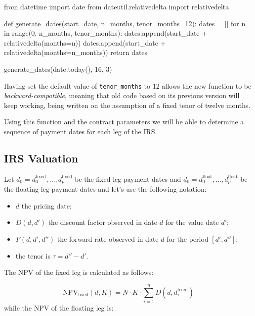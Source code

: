 \begin{ipython}
from datetime import date
from dateutil.relativedelta import relativedelta

def generate_dates(start_date, n_months, tenor_months=12):
    dates = []
    for n in range(0, n_months, tenor_months):
        dates.append(start_date + relativedelta(months=n))
    dates.append(start_date + relativedelta(months=n_months))
    return dates
    
generate_dates(date.today(), 16, 3)
\end{ipython}
\begin{ioutput}
\end{ioutput}
Having set the default value of \texttt{tenor\_months} to 12 allows the new function to be \emph{backward-compatible}, meaning that old code based on its previous version will keep working, being written on the assumption of a fixed tenor of twelve months. 
       
Using this function and the contract parameters we will be able to determine a sequence of payment dates for each leg of the IRS.

\subsection{IRS Valuation}
\label{irs-valuation}

Let \(d_0=d_0^{\mathrm{fixed}},...,d_p^{\mathrm{fixed}}\) be the fixed leg payment dates and \(d_0=d_0^{\mathrm{float}},...,d_p^{\mathrm{float}}\) be the floating leg payment dates and let's use the following notation:

\begin{itemize}
\tightlist
\item
  \(d\) the pricing date;
\item
  \(D(d, d')\) the discount factor observed in date \(d\) for the value date \(d'\);
\item
  \(F(d, d', d'')\) the forward rate observed in date \(d\) for the period \([d', d'']\); 
  \item the tenor is \(\tau = d'' - d'\).
\end{itemize}
The NPV of the fixed leg is calculated as follows:

\begin{equation}
\mathrm{NPV}_{\mathrm{fixed}}(d, K) = N\cdot K\cdot\sum_{i=1}^{n}D(d, d_{i}^{\mathrm{fixed}})\end{equation}
while the NPV of the floating leg is:

